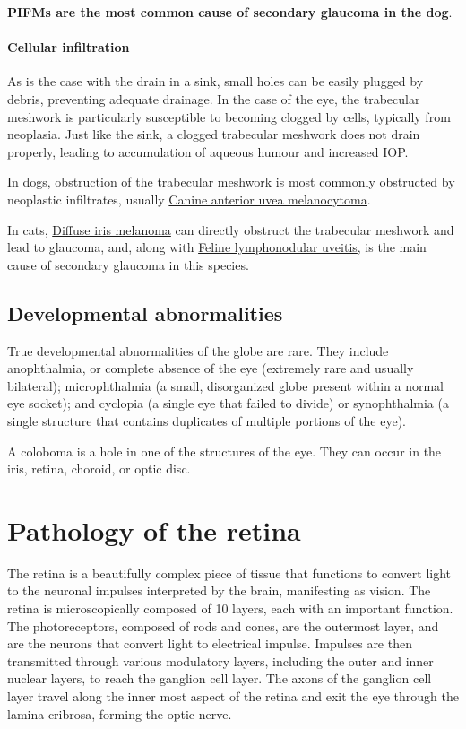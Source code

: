 \documentclass[openany]{article}
\let\oldparagraph\paragraph
\renewcommand{\paragraph}[1]{\oldparagraph{#1}\mbox{}}
\begin{document}
\textbf{PIFMs are the most common cause of secondary glaucoma in the
dog}.

\paragraph{Cellular infiltration}\label{cellular-infiltration}

As is the case with the drain in a sink, small holes can be easily
plugged by debris, preventing adequate drainage. In the case of the eye,
the trabecular meshwork is particularly susceptible to becoming clogged
by cells, typically from neoplasia. Just like the sink, a clogged
trabecular meshwork does not drain properly, leading to accumulation of
aqueous humour and increased IOP.

In dogs, obstruction of the trabecular meshwork is most commonly
obstructed by neoplastic infiltrates, usually
\protect\hyperlink{canine-anterior-uvea-melanocytoma}{Canine anterior
uvea melanocytoma}.

In cats, \protect\hyperlink{diffuse-iris-melanoma}{Diffuse iris
melanoma} can directly obstruct the trabecular meshwork and lead to
glaucoma, and, along with
\protect\hyperlink{feline-lymphonodular-uveitis}{Feline lymphonodular
uveitis}, is the main cause of secondary glaucoma in this species.

\subsection{Developmental
abnormalities}\label{developmental-abnormalities}

True developmental abnormalities of the globe are rare. They include
anophthalmia, or complete absence of the eye (extremely rare and usually
bilateral); microphthalmia (a small, disorganized globe present within a
normal eye socket); and cyclopia (a single eye that failed to divide) or
synophthalmia (a single structure that contains duplicates of multiple
portions of the eye).

A coloboma is a hole in one of the structures of the eye. They can occur
in the iris, retina, choroid, or optic disc.

\hypertarget{pathology-of-the-retina}{\section{Pathology of the
retina}\label{pathology-of-the-retina}}

The retina is a beautifully complex piece of tissue that functions to
convert light to the neuronal impulses interpreted by the brain,
manifesting as vision. The retina is microscopically composed of 10
layers, each with an important function. The photoreceptors, composed of
rods and cones, are the outermost layer, and are the neurons that
convert light to electrical impulse. Impulses are then transmitted
through various modulatory layers, including the outer and inner nuclear
layers, to reach the ganglion cell layer. The axons of the ganglion cell
layer travel along the inner most aspect of the retina and exit the eye
through the lamina cribrosa, forming the optic nerve.
\end{document}
